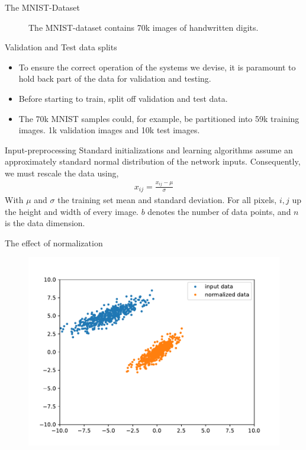 \documentclass{beamer}
\begin{document}
    \begin{frame}{The MNIST-Dataset}
      \begin{figure}
        
        \caption{The MNIST-dataset contains 70k images of handwritten digits.}
      \end{figure}
    \end{frame}

    \begin{frame}{Validation and Test data splits}
      \begin{itemize}
        \item To ensure the correct operation of the systems we devise, it is paramount to 
        hold back part of the data for validation and testing.
        \item Before starting to train, split off validation and test data.
        \item The 70k MNIST samples could, for example, be partitioned into 59k training images.
        1k validation images and 10k test images. 
      \end{itemize}
    \end{frame}

    \begin{frame}{Input-preprocessing}
      Standard initializations and learning algorithms assume an approximately standard normal distribution
      of the network inputs. Consequently, we must rescale the data using,
      \begin{align}
        {x}_{ij} = \frac{x_{ij} - \mu}{\sigma}
      \end{align}
      With $\mu$ and $\sigma$ the training set mean and standard deviation.
      For all pixels, $i,j$ up the height and width of every image.
      $b$ denotes the number of data points, and $n$ is the data dimension.
    \end{frame}

    \begin{frame}{The effect of normalization}
      \begin{figure}
      \includegraphics[width=\linewidth]{./figures/normalized.pdf}
      \end{figure}
    \end{frame}
\end{document}
